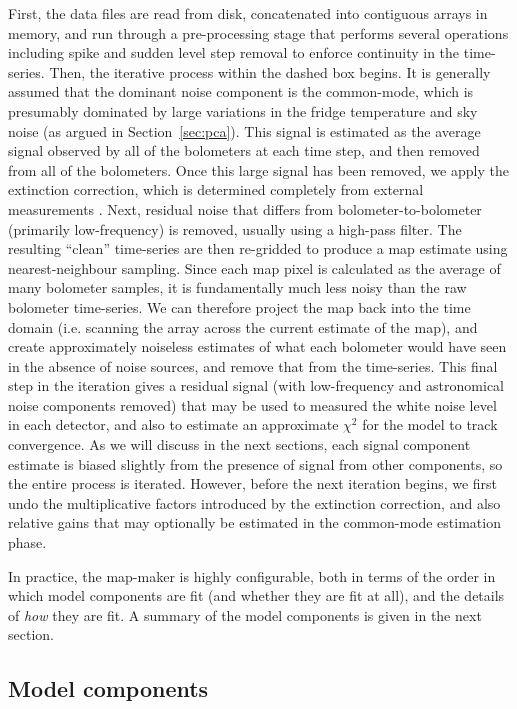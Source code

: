 \documentclass[useAMS,usenatbib,nofootinbib]{mn2e}
\begin{document}
First, the data files are read from disk, concatenated into contiguous
arrays in memory, and run through a pre-processing stage that performs
several operations including spike and sudden level step removal to
enforce continuity in the time-series. Then, the iterative process
within the dashed box begins. It is generally assumed that the
dominant noise component is the common-mode, which is presumably
dominated by large variations in the fridge temperature and sky noise
(as argued in Section~\ref{sec:pca}). This signal is estimated as the
average signal observed by all of the bolometers at each time step,
and then removed from all of the bolometers. Once this large signal
has been removed, we apply the extinction correction, which is
determined completely from external measurements
\citep[see][]{dempsey2011}. Next, residual noise that differs from
bolometer-to-bolometer (primarily low-frequency) is removed, usually
using a high-pass filter. The resulting ``clean'' time-series are then
re-gridded to produce a map estimate using nearest-neighbour
sampling. Since each map pixel is calculated as the average of many
bolometer samples, it is fundamentally much less noisy than the raw
bolometer time-series. We can therefore project the map back into the
time domain (i.e. scanning the array across the current estimate of
the map), and create approximately noiseless estimates of what each
bolometer would have seen in the absence of noise sources, and remove
that from the time-series. This final step in the iteration gives a
residual signal (with low-frequency and astronomical noise components
removed) that may be used to measured the white noise level in each
detector, and also to estimate an approximate $\chi^2$ for the model
to track convergence. As we will discuss in the next sections, each
signal component estimate is biased slightly from the presence of
signal from other components, so the entire process is
iterated. However, before the next iteration begins, we first undo the
multiplicative factors introduced by the extinction correction, and
also relative gains that may optionally be estimated in the
common-mode estimation phase.

In practice, the map-maker is highly configurable, both in terms of
the order in which model components are fit (and whether they are fit
at all), and the details of \emph{how} they are fit. A summary of the
model components is given in the next section.

\subsection{Model components}
\label{sec:components}
\end{document}
